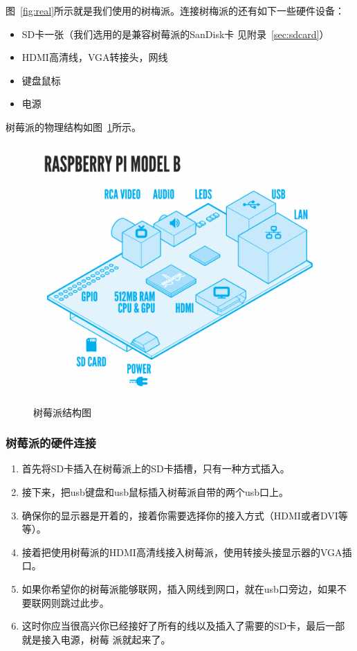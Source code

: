 图~\ref{fig:real}所示就是我们使用的树梅派。连接树梅派的还有如下一些硬件设备：
\begin{itemize}
\item SD卡一张（我们选用的是兼容树莓派的SanDisk卡 见附录~\ref{sec:sdcard}）
\item HDMI高清线，VGA转接头，网线
\item 键盘鼠标
\item 电源
\end{itemize}

树莓派的物理结构如图~\ref{fig:structure}所示。

\begin{figure}
  \centering
    \includegraphics[width=.7\textwidth]{pic/structure}
  \caption{树莓派结构图}
  \label{fig:structure}
\end{figure}

\subsubsection{树莓派的硬件连接}

\begin{enumerate}
\item 首先将SD卡插入在树莓派上的SD卡插槽，只有一种方式插入。
\item 接下来，把usb键盘和usb鼠标插入树莓派自带的两个usb口上。
\item 确保你的显示器是开着的，接着你需要选择你的接入方式（HDMI或者DVI等等）。
\item 接着把使用树莓派的HDMI高清线接入树莓派，使用转接头接显示器的VGA插口。
\item 如果你希望你的树莓派能够联网，插入网线到网口，就在usb口旁边，如果不要联网则跳过此步。
\item 这时你应当很高兴你已经接好了所有的线以及插入了需要的SD卡，最后一部就是接入电源，树莓
  派就起来了。
\end{enumerate}


